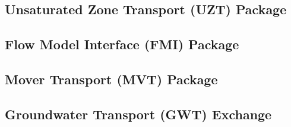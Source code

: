 \newpage
\subsection{Unsaturated Zone Transport (UZT) Package}


\newpage
\subsection{Flow Model Interface (FMI) Package}


\newpage
\subsection{Mover Transport (MVT) Package}


\newpage
\subsection{Groundwater Transport (GWT) Exchange}


